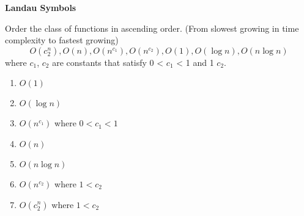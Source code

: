 \question \textbf{Landau Symbols}

\begin{parts}

Order the class of functions in ascending order. (From slowest growing in time complexity
to fastest growing)
\begin{equation}
O(c_2^n), O(n), O(n^{c_1}), O(n^{c_2}), O(1), O(\log n), O(n \log n)
\end{equation}
where \(c_1\), \(c_2\) are constants that satisfy 0 < \(c_1\) < 1 and 1 \(c_2\).

\begin{solution}
\begin{enumerate}
\item \(O(1)\)
\item \(O(\log n)\)
\item \(O(n^{c_1})\) where \(0 < c_1 < 1\)
\item \(O(n)\)
\item \(O(n \log n)\)
\item \(O(n^{c_2})\) where \(1 < c_2\)
\item \(O(c_2^n)\) where \(1 < c_2\)
\end{enumerate}
\end{solution}

\end{parts}
